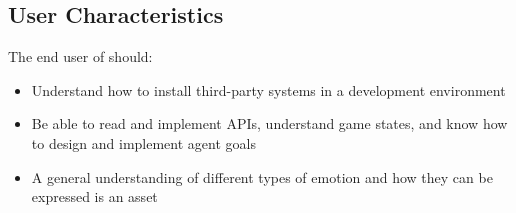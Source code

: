 \subsection{User Characteristics} \label{SecUserCharacteristics}
The end user of \progname{} should:
\begin{itemize}

    \item Understand how to install third-party systems in a development 
    environment

    \item Be able to read and implement APIs, understand game states, and know 
    how to design and implement agent goals

    \item A general understanding of different types of emotion and how they 
    can be expressed is an asset

\end{itemize}